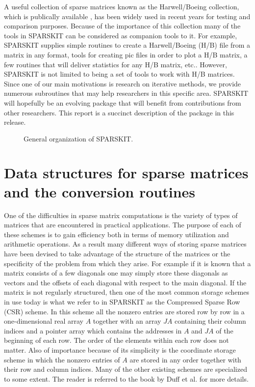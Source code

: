 A useful collection of sparse matrices known as the Harwell/Boeing
collection, which is publically available \cite{Duff-HB}, has been
widely used in recent years for testing and comparison purposes.
Because of the importance of this collection many of the tools in
SPARSKIT can be considered as companion tools to it. For
example, SPARSKIT supplies simple routines to create a Harwell/Boeing (H/B)
file from a matrix in any format, tools for creating pic files in
order to plot a H/B matrix, a few routines that will deliver
statistics for any H/B matrix, etc.. However, SPARSKIT is not limited
to being a set of tools to 
work with H/B matrices. Since one of our main motivations is
research on iterative methods, we provide numerous subroutines that may help
researchers in this specific area.  
SPARSKIT will hopefully be an evolving package
that will benefit from contributions from other researchers. This
report is a succinct description of the  package in this release.

\begin{figure}[h]
\vspace{2.25in}
\caption {General organization of SPARSKIT.}
\label{organization}
\end{figure}

\vskip 1cm
\section{Data structures for sparse matrices and the conversion routines}

One of the difficulties in sparse matrix computations is the variety
of types of matrices that are encountered in practical applications.
The purpose of each of these schemes is to gain efficiency both in
terms of memory utilization and arithmetic operations.  As a result
many different ways of storing sparse matrices have been devised to
take advantage of the structure of the matrices or the specificity of
the problem from which they arise.  For example if it is known that a
matrix consists of a few diagonals one may simply store these
diagonals as vectors and the offsets of each diagonal with respect to
the main diagonal.  If the matrix is not regularly structured, then
one of the most common storage schemes in use today is what we refer
to in SPARSKIT as the Compressed Sparse Row (CSR) scheme. In this
scheme all the nonzero entries are stored row by row  in a 
one-dimensional real array $A$ together with an array $JA$ containing
their column indices and a pointer array which contains the addresses
in $A$ and $JA$ of the beginning of each row. The order of the elements 
within each row does not matter. Also of importance
because of its simplicity is the coordinate storage scheme in which
the nonzero entries of $A$ are stored in any order together with their
row and column indices.  Many of the other existing schemes are
specialized to some extent. The reader is
referred to the book by Duff et al. \cite{Duff-book} for more details.

